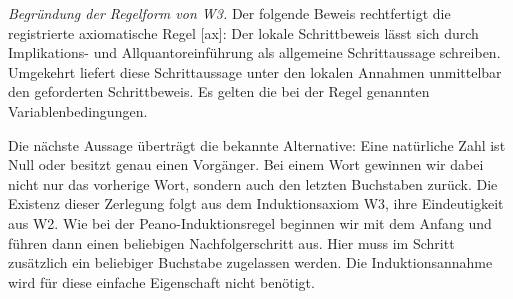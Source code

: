 \noindent\textit{Begründung der Regelform von W3.}
Der folgende Beweis rechtfertigt die registrierte axiomatische Regel
[ax]: Der lokale
Schrittbeweis lässt sich durch Implikations- und Allquantoreinführung
als allgemeine Schrittaussage schreiben. Umgekehrt liefert diese
Schrittaussage unter den lokalen Annahmen unmittelbar den geforderten
Schrittbeweis. Es gelten die bei der Regel genannten
Variablenbedingungen.
\begin{tabproofwide}
\end{tabproofwide}

Die nächste Aussage überträgt die bekannte Alternative: Eine natürliche
Zahl ist Null oder besitzt genau einen Vorgänger. Bei einem Wort
gewinnen wir dabei nicht nur das vorherige Wort, sondern auch den
letzten Buchstaben zurück. Die Existenz dieser Zerlegung folgt aus
dem Induktionsaxiom W3, ihre Eindeutigkeit aus W2. Wie bei der
Peano-Induktionsregel beginnen wir mit dem Anfang und führen dann einen
beliebigen Nachfolgerschritt aus. Hier muss im Schritt zusätzlich ein
beliebiger Buchstabe zugelassen werden. Die Induktionsannahme wird für
diese einfache Eigenschaft nicht benötigt.

